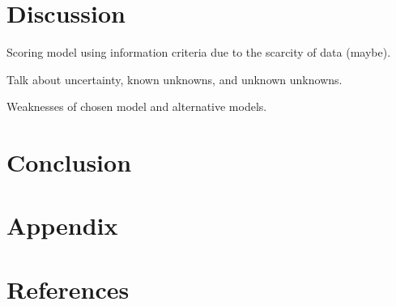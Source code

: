 \documentclass[]{article}
\begin{document}
\hypertarget{discussion}{%
\section{Discussion}\label{discussion}}

Scoring model using information criteria due to the scarcity of data
(maybe).

Talk about uncertainty, known unknowns, and unknown unknowns.

Weaknesses of chosen model and alternative models.

\hypertarget{conclusion}{%
\section{Conclusion}\label{conclusion}}

\hypertarget{appendix}{%
\section{Appendix}\label{appendix}}

\hypertarget{references}{%
\section{References}\label{references}}
\end{document}
